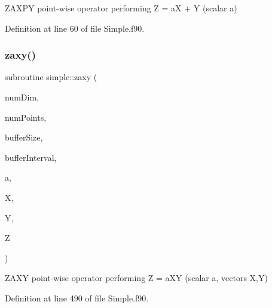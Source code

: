 Z\+A\+X\+PY point-\/wise operator performing Z = aX + Y (scalar a) 



Definition at line 60 of file Simple.\+f90.

\hypertarget{namespacesimple_ae6dbf69a747fb390e16608ca1bb00f72}{}\label{namespacesimple_ae6dbf69a747fb390e16608ca1bb00f72} 
\subsubsection{\texorpdfstring{zaxy()}{zaxy()}}
{\footnotesize\ttfamily subroutine simple\+::zaxy (\begin{DoxyParamCaption}\item[{integer(kind=4), intent(in)}]{num\+Dim,  }\item[{integer(kind=8), intent(in)}]{num\+Points,  }\item[{integer(kind=8), dimension(numdim), intent(in)}]{buffer\+Size,  }\item[{integer(kind=8), dimension(2$\ast$numdim), intent(in)}]{buffer\+Interval,  }\item[{real(kind=8), intent(in)}]{a,  }\item[{real(kind=8), dimension(numpoints), intent(in)}]{X,  }\item[{real(kind=8), dimension(numpoints), intent(in)}]{Y,  }\item[{real(kind=8), dimension(numpoints), intent(out)}]{Z }\end{DoxyParamCaption})}



Z\+A\+XY point-\/wise operator performing Z = a\+XY (scalar a, vectors X,Y) 



Definition at line 490 of file Simple.\+f90.

\hypertarget{namespacesimple_a50d92e3aba4d5a783488f2f0491a486e}{}\label{namespacesimple_a50d92e3aba4d5a783488f2f0491a486e} 
